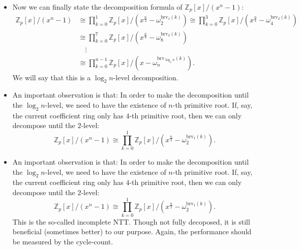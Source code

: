 \begin{frame}
    \begin{itemize}
        \item <1->Now we can finally state the decomposition formula of \( \mathbb{Z}_{p}[x]/(x^{n}-1) \):
            \begin{align*}
                \mathbb{Z}_{p}[x]/(x^{n}-1) 
                & \cong \prod_{k=0}^{1} \mathbb{Z}_{p}[x]/(x^{\frac{n}{2}}-\omega_{2}^{\mathrm{brv}_{1}(k)})
                 \cong \prod_{k=0}^{3} \mathbb{Z}_{p}[x]/(x^{\frac{n}{4}}-\omega_{4}^{\mathrm{brv}_{2}(k)})\\
                & \cong \prod_{k=0}^{7} \mathbb{Z}_{p}[x]/(x^{\frac{n}{8}}-\omega_{8}^{\mathrm{brv}_{3}(k)})\\
                & \quad \vdots\\
                & \cong \prod_{k=0}^{n-1} \mathbb{Z}_{p}[x]/(x-\omega_{n}^{\mathrm{brv}_{\log_{2}n}(k)}).
            \end{align*}
            We will say that this is a \( \log_{2}n \)-level decomposition.
        \item <2->An important observation is that:
        In order to make the decomposition until the \( \log_{2}n \)-level, we need to have the existence of \( n \)-th primitive root.
        If, say, the current coefficient ring only has \( 4 \)-th primitive root, then we can only decompose until the \( 2 \)-level:
        \[
            \mathbb{Z}_{p}[x]/(x^{n}-1) 
            \cong \prod_{k=0}^{1} \mathbb{Z}_{p}[x]/(x^{\frac{n}{2}}-\omega_{2}^{\mathrm{brv}_{1}(k)}).
        \]
    \end{itemize}
\end{frame}

\begin{frame}
    \begin{itemize}
        \item An important observation is that:
        In order to make the decomposition until the \( \log_{2}n \)-level, we need to have the existence of \( n \)-th primitive root.
        If, say, the current coefficient ring only has \( 4 \)-th primitive root, then we can only decompose until the \( 2 \)-level:
        \[
            \mathbb{Z}_{p}[x]/(x^{n}-1) 
            \cong \prod_{k=0}^{1} \mathbb{Z}_{p}[x]/(x^{\frac{n}{2}}-\omega_{2}^{\mathrm{brv}_{1}(k)}).
        \]
        This is the so-called incomplete NTT. 
        Though not fully decoposed, it is still beneficial (sometimes better) to our purpose.
        Again, the performance should be measured by the cycle-count.
    \end{itemize}
\end{frame}



